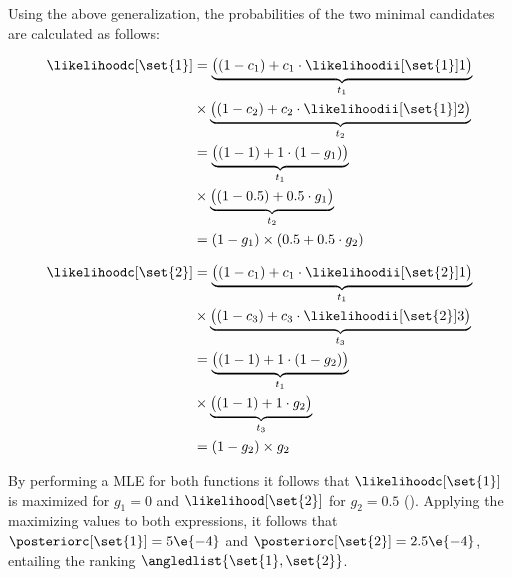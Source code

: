 Using the above generalization, the probabilities of the two minimal
candidates are calculated as follows:


\begin{equation}
  \begin{split}
    \likelihoodc[\set{1}]{} &=
    \underbrace{ \big((1-c_1) + c_1 \cdot \likelihoodii[\set{1}]{1} \big)}_{t_1}\\
    &\times \underbrace{\big((1 - c_2) + c_2 \cdot \likelihoodii[\set{1}]{2}\big)}_{t_2}\\
    &=\underbrace{\big((1-1) + 1 \cdot (1 - g_1)\big)}_{t_1}\\
    &\times \underbrace{\big((1 - 0.5) + 0.5 \cdot g_1\big)}_{t_2}\\
    &=(1 - g_1) \times (0.5 + 0.5 \cdot g_2)
  \end{split}
\end{equation}

\begin{equation}
  \begin{split}
    \likelihoodc[\set{2}]{} &=
    \underbrace{\big((1-c_1) + c_1 \cdot \likelihoodii[\set{2}]{1}\big)}_{t_1}\\
    &\times \underbrace{\big((1 - c_3) + c_3 \cdot \likelihoodii[\set{2}]{3}\big)}_{t_3}\\
    &=\underbrace{\big((1-1) + 1 \cdot (1 - g_2)\big)}_{t_1}\\
    &\times \underbrace{\big((1 - 1) + 1\cdot g_2\big)}_{t_3}\\
    &=(1 - g_2) \times g_2
  \end{split}
\end{equation}

By performing a \ac{MLE} for both functions it follows that
$\likelihoodc[\set{1}]$ is maximized for $g_1=0$ and
$\likelihood[\set{2}]$ for $g_2 = 0.5$ ().
%
Applying the maximizing values to both expressions, it follows that
$\posteriorc[\set{1}] = 5\e{-4}$ and
$\posteriorc[\set{2}] = 2.5\e{-4}$, entailing the ranking
$\angledlist{\set{1}, \set{2}}$.



